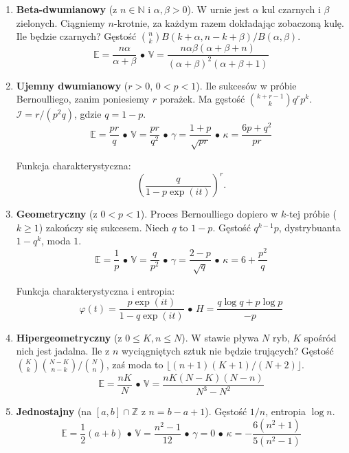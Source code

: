 \documentclass[a4paper, landscape]{extarticle}
\newcommand{\N}{\mathbb N}
\newcommand{\Z}{\mathbb{Z}}
\newcommand{\expected}{\mathbb{E}}
\newcommand{\variance}{\mathbb{V}}
\newenvironment{enumx}{\begin{enumerate} \setlength{\itemsep}{0pt} \setlength{\parskip}{0pt} \setlength{\parsep}{0pt}}{\end{enumerate}}
\begin{document}
\begin{multicols*}{3}
\begin{enumx}
	F. charakterystyczna $(q + p\exp(it))^n$, entropia: \[H = \frac 12 \log (2\pi e npq) + O(1/n).\]

\item \textbf{Beta-dwumianowy} (z $n \in \N$ i $\alpha, \beta > 0$).
	W urnie jest $\alpha$ kul czarnych i $\beta$ zielonych.
	Ciągniemy $n$-krotnie, za każdym razem dokładając zobaczoną kulę. Ile będzie czarnych?
	Gęstość ${n \choose k} B(k + \alpha, n - k + \beta) / B(\alpha, \beta)$.
	\[
		\expected = \frac{n\alpha}{\alpha + \beta} \,\bullet\,
		\variance = \frac{n \alpha \beta (\alpha + \beta + n)}{(\alpha + \beta)^2 (\alpha + \beta + 1)}
	\]

\item \textbf{Ujemny dwumianowy} ($r > 0$, $0 < p < 1$).
	Ile sukcesów w próbie Bernoulliego, zanim poniesiemy $r$ porażek.
	Ma gęstość ${k + r - 1 \choose k} q^r p^k$.
	$\mathcal I = r / (p^2q)$, gdzie $q = 1 - p$.
	\[
		\expected = \frac{pr}q \,\bullet\,
		\variance = \frac{pr}{q^2} \,\bullet\,
		\gamma = \frac{1+p}{\sqrt{pr}} \,\bullet\,
		\kappa = \frac{6p + q^2}{pr}
	\]

Funkcja charakterystyczna: \[\left(\frac{q}{1-p\exp (it)}\right)^r.\]

\item \textbf{Geometryczny} (z $0 < p < 1$).
	Proces Bernoulliego dopiero w $k$-tej próbie ($k \ge 1$) zakończy się sukcesem.
	Niech $q$ to $1-p$.
	Gęstość $q^{k-1} p$, dystrybuanta $1 - q^k$, moda $1$.
	\[
		\expected = \frac 1 p \,\bullet\,
		\variance = \frac{q}{p^2} \,\bullet\,
		\gamma = \frac{2-p}{\sqrt{q}} \,\bullet\,
		\kappa = 6 + \frac{p^2}{q}
	\]

	Funkcja charakterystyczna i entropia:
	\[
		\varphi(t) = \frac{p \exp (it)}{1 - q\exp(it)} \,\bullet\,
		H = \frac{q \log q + p \log p}{-p}
	\]

\item \textbf{Hipergeometryczny} (z $0 \le K, n \le N$).
	W stawie pływa $N$ ryb, $K$ spośród nich jest jadalna.
	Ile z $n$ wyciągniętych sztuk nie będzie trujących?
	Gęstość ${K \choose k}{N - K \choose n-k} / {N \choose n}$, zaś moda to $\lfloor(n+1)(K+1) / (N+2) \rfloor$.
	\[
		\expected = \frac {nK}N \,\bullet\,
		\variance = \frac{nK(N-K)(N-n)}{N^3-N^2}
	\]

\item \textbf{Jednostajny} (na $[a,b] \cap \Z$ z $n = b - a +1$).
	Gęstość $1/n$, entropia $\log n$.
	\[
		\expected = \frac 12 (a+b) \,\bullet\,
		\variance = \frac {n^2-1}{12} \,\bullet\,
		\gamma = 0 \,\bullet\,
		\kappa = - \frac{6(n^2+1)}{5(n^2-1)}
	\]


\end{enumx}
\end{multicols*}
\end{document}
